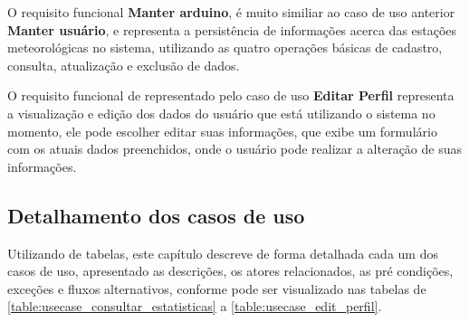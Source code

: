 O requisito funcional \textbf{Manter arduino}, é muito similiar ao caso de uso anterior \textbf{Manter usuário}, e representa a persistência de informações acerca das estações meteorológicas no sistema, utilizando as quatro operações básicas de cadastro, consulta, atualização e exclusão de dados.

O requisito funcional de representado pelo caso de uso \textbf{Editar Perfil} representa a visualização e edição dos dados do usuário que está utilizando o sistema no momento, ele pode escolher editar suas informações, que exibe um formulário com os atuais dados preenchidos, onde o usuário pode realizar a alteração de suas informações.

\subsection{Detalhamento dos casos de uso}

Utilizando de tabelas, este capítulo descreve de forma detalhada cada um dos casos de uso, apresentado as descrições, os atores relacionados, as pré condições, exceções e fluxos alternativos, conforme pode ser visualizado nas tabelas de \ref{table:usecase_consultar_estatisticas} a \ref{table:usecase_edit_perfil}.

